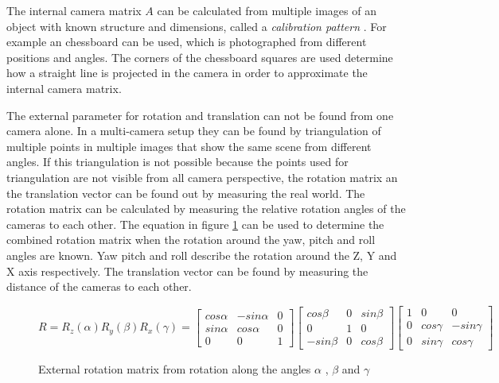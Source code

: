 The internal camera matrix $ A $ can be calculated from multiple images of an object with known structure and dimensions, called a \emph{calibration pattern} \textcite{opencv2018calibration}. 
For example an chessboard can be used, which is photographed from different positions and angles. 
The corners of the chessboard squares are used determine how a straight line is projected in the camera in order to approximate the internal camera matrix.

The external parameter for rotation and translation can not be found from one camera alone.
In a multi-camera setup they can be found by triangulation of multiple points in multiple images that show the same scene from different angles.
If this triangulation is not possible because the points used for triangulation are not visible from all camera perspective, the rotation matrix an the translation vector can be found out by measuring the real world.
The rotation matrix can be calculated by measuring the relative rotation angles of the cameras to each other.
The equation in figure \ref{eq:sota:rotation} can be used to determine the combined rotation matrix when the rotation around the yaw, pitch and roll angles are known. 
Yaw pitch and roll describe the rotation around the Z, Y and X axis respectively.
The translation vector can be found by measuring the distance of the cameras to each other.

\begin{figure}[h!]
\centering
\begin{equation*}
    R
    =
    R_z(\alpha)R_y(\beta)R_x(\gamma)
    =
    \begin{bmatrix}
    cos \alpha{} & - sin \alpha{} & 0 \\
    sin \alpha{} & cos \alpha{} & 0 \\
    0 & 0 & 1 
    \end{bmatrix}
    \begin{bmatrix}
    cos \beta{} & 0 & sin \beta{} \\
    0 & 1 & 0 \\
    - sin \beta{} & 0 & cos \beta{}
    \end{bmatrix}
    \begin{bmatrix}
    1 & 0 & 0 \\
    0 & cos \gamma{} & - sin \gamma{} \\
    0 & sin \gamma{} & cos \gamma{} 
    \end{bmatrix}
\end{equation*}
\caption{External rotation matrix from rotation along the angles $ \alpha{} $ , $ \beta{} $ and $ \gamma{} $ }
\label{eq:sota:rotation}
\end{figure}

